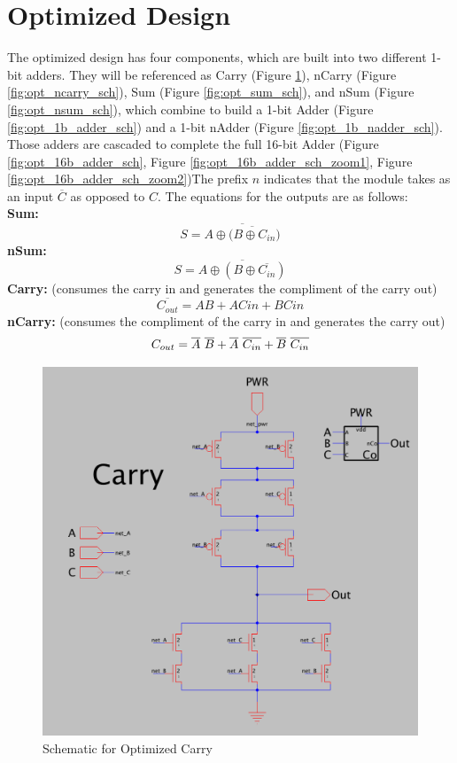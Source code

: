 \documentclass{article}
\newcommand*\xor{\mathbin{\oplus}}
\begin{document}
\pagebreak

\section{Optimized Design}
The optimized design has four components, which are built into two different 1-bit adders. They will be referenced as Carry (Figure \ref{fig:opt_carry_sch}), nCarry (Figure \ref{fig:opt_ncarry_sch}), Sum (Figure \ref{fig:opt_sum_sch}), and nSum (Figure \ref{fig:opt_nsum_sch}), which combine to build a 1-bit Adder (Figure \ref{fig:opt_1b_adder_sch}) and a 1-bit nAdder (Figure \ref{fig:opt_1b_nadder_sch}). Those adders are cascaded to complete the full 16-bit Adder (Figure \ref{fig:opt_16b_adder_sch}, Figure \ref{fig:opt_16b_adder_sch_zoom1}, Figure \ref{fig:opt_16b_adder_sch_zoom2})The prefix $n$ indicates that the module takes as an input $\overline{C}$ as opposed to $C$. The equations for the outputs are as follows:\\
\textbf{Sum:}\\
$$S = \overline{A \xor \overline{(B \xor C_{in}})}$$
\textbf{nSum:}\\
$$S = \overline{A \xor (B \xor \overline{C_{in}})}$$
\textbf{Carry:} (consumes the carry in and generates the compliment of the carry out)\\
$$\overline{C_{out}} = AB + ACin + BCin$$
\textbf{nCarry:} (consumes the compliment of the carry in and generates the carry out)\\
$$C_{out} = \overline{A}\textnormal{ }\overline{B} + \overline{A}\textnormal{ }\overline{C_{in}} + \overline{B}\textnormal{ }\overline{C_{in}}$$

\begin{figure}[H]
  \includegraphics[width=\linewidth]{opt_screenshots/opt_carry_sch.png}
  \caption{Schematic for Optimized Carry}
  \label{fig:opt_carry_sch}
\end{figure}
\end{document}
